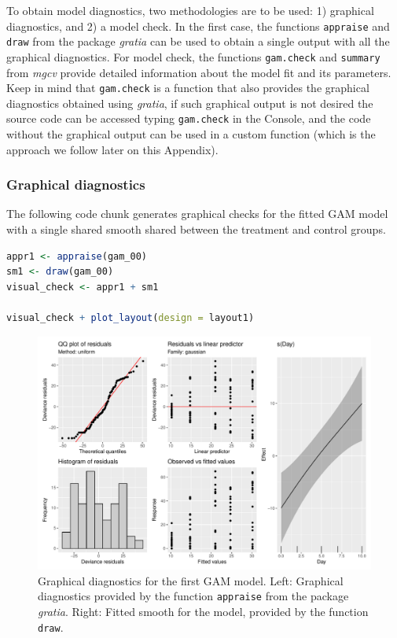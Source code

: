 \documentclass[
]{article}
\newcommand{\passthrough}[1]{#1}
\begin{document}
To obtain model diagnostics, two methodologies are to be used: 1) graphical diagnostics, and 2) a model check. In the first case, the functions \passthrough{\lstinline!appraise!} and \passthrough{\lstinline!draw!} from the package \emph{gratia} can be used to obtain a single output with all the graphical diagnostics. For model check, the functions \passthrough{\lstinline!gam.check!} and \passthrough{\lstinline!summary!} from \emph{mgcv} provide detailed information about the model fit and its parameters. Keep in mind that \passthrough{\lstinline!gam.check!} is a function that also provides the graphical diagnostics obtained using \emph{gratia}, if such graphical output is not desired the source code can be accessed typing \passthrough{\lstinline!gam.check!} in the Console, and the code without the graphical output can be used in a custom function (which is the approach we follow later on this Appendix).

\hypertarget{graphical-diagnostics}{%
\subsubsection{Graphical diagnostics}\label{graphical-diagnostics}}

The following code chunk generates graphical checks for the fitted GAM model with a single shared smooth shared between the treatment and control groups.

\begin{lstlisting}[language=R]
appr1 <- appraise(gam_00)
sm1 <- draw(gam_00)
visual_check <- appr1 + sm1

visual_check + plot_layout(design = layout1)
\end{lstlisting}

\begin{figure}

{\centering \includegraphics[width=0.75\linewidth]{Appendix_A_files/figure-latex/first-GAM-diag-1} 

}

\caption{Graphical diagnostics for the first GAM model. Left: Graphical diagnostics provided by the function \passthrough{\lstinline!appraise!} from the package \emph{gratia}. Right: Fitted smooth for the model, provided by the function \passthrough{\lstinline!draw!}.}\label{fig:first-GAM-diag}
\end{figure}
\end{document}
